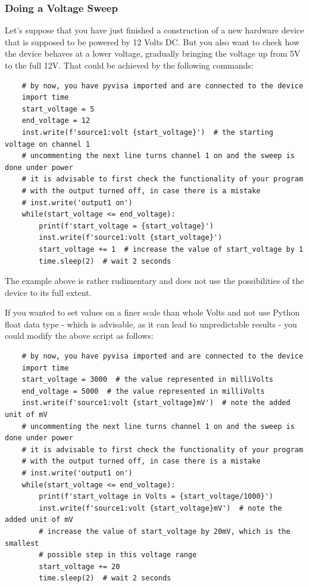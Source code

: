 \documentclass[a4paper,10pt]{article}
\begin{document}
\subsubsection{Doing a Voltage Sweep}
Let's suppose that you have just finished a construction of a new hardware device that is supposed to be powered by 12 Volts DC. But you also want to check how the device behaves at a lower voltage, gradually bringing the voltage up from 5V to the full 12V. That could be achieved by the following commands:
\begin{verbatim}
    # by now, you have pyvisa imported and are connected to the device
    import time
    start_voltage = 5
    end_voltage = 12
    inst.write(f'source1:volt {start_voltage}')  # the starting voltage on channel 1
    # uncommenting the next line turns channel 1 on and the sweep is done under power
    # it is advisable to first check the functionality of your program
    # with the output turned off, in case there is a mistake
    # inst.write('output1 on')
    while(start_voltage <= end_voltage):
        print(f'start_voltage = {start_voltage}')
        inst.write(f'source1:volt {start_voltage}')
        start_voltage += 1  # increase the value of start_voltage by 1
        time.sleep(2)  # wait 2 seconds
\end{verbatim}

The example above is rather rudimentary and does not use the possibilities of the device to its full extent.

If you wanted to set values on a finer scale than whole Volts and not use Python float data type - which is advisable, as it can lead to unpredictable results - you could modify the above script as follows:

\begin{verbatim}
    # by now, you have pyvisa imported and are connected to the device
    import time
    start_voltage = 3000  # the value represented in milliVolts 
    end_voltage = 5000  # the value represented in milliVolts
    inst.write(f'source1:volt {start_voltage}mV')  # note the added unit of mV
    # uncommenting the next line turns channel 1 on and the sweep is done under power
    # it is advisable to first check the functionality of your program
    # with the output turned off, in case there is a mistake
    # inst.write('output1 on')
    while(start_voltage <= end_voltage):
        print(f'start_voltage in Volts = {start_voltage/1000}')
        inst.write(f'source1:volt {start_voltage}mV')  # note the added unit of mV
        # increase the value of start_voltage by 20mV, which is the smallest
        # possible step in this voltage range
        start_voltage += 20
        time.sleep(2)  # wait 2 seconds
\end{verbatim}
\end{document}
